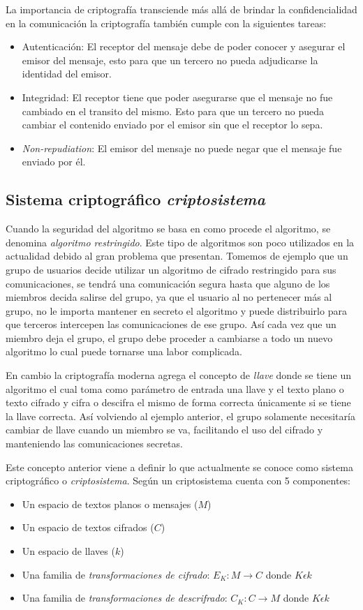 La importancia de criptografía transciende más allá de brindar la confidencialidad en la comunicación la criptografía también cumple con la siguientes tareas:
\begin{itemize}
\item Autenticación: El receptor del mensaje debe de poder conocer y asegurar el emisor del mensaje, esto para que un tercero no pueda adjudicarse la identidad del emisor.
\item Integridad: El receptor tiene que poder asegurarse que el mensaje no fue cambiado en el transito del mismo. Esto para que un tercero no pueda cambiar el contenido enviado por el emisor sin que el receptor lo sepa.
\item \textit{Non-repudiation}: El emisor del mensaje no puede negar que el mensaje fue enviado por él. 
\end{itemize}

\subsection{Sistema criptográfico \textit{criptosistema}}
Cuando la seguridad del algoritmo se basa en como procede el algoritmo, se denomina \textit{algoritmo restringido}. Este tipo de algoritmos son poco utilizados en la actualidad debido al gran problema que presentan. Tomemos de ejemplo que un grupo de usuarios decide utilizar un algoritmo de cifrado restringido para sus comunicaciones, se tendrá una comunicación segura hasta que alguno de los miembros decida salirse del grupo, ya que el usuario al no pertenecer más al grupo, no le importa mantener en secreto el algoritmo y puede distribuirlo para que terceros intercepen las comunicaciones de ese grupo. Así cada vez que un miembro deja el grupo, el grupo debe proceder a cambiarse a todo un nuevo algoritmo lo cual puede tornarse una labor complicada.

En cambio la criptografía moderna agrega el concepto de \textit{llave} donde se tiene un algoritmo el cual toma como parámetro de entrada una llave y el texto plano o texto cifrado y cifra o descifra el mismo de forma correcta únicamente si se tiene la llave correcta. Así volviendo al ejemplo anterior, el grupo solamente necesitaría cambiar de llave cuando un miembro se va, facilitando el uso del cifrado y manteniendo las comunicaciones secretas.

Este concepto anterior viene a definir lo que actualmente se conoce como sistema criptográfico o \textit{criptosistema}. Según \cite{denning} un criptosistema cuenta con 5 componentes:
\begin{itemize}
\item Un espacio de textos planos o mensajes ($M$)
\item Un espacio de textos cifrados ($C$)
\item Un espacio de llaves ($k$)
\item Una familia de \textit{transformaciones de cifrado}: $E_K: M\rightarrow C$ donde $K \epsilon  k$
\item Una familia de \textit{transformaciones de descrifrado}: $C_K: C\rightarrow M$ donde $K \epsilon  k$
\end{itemize} 


